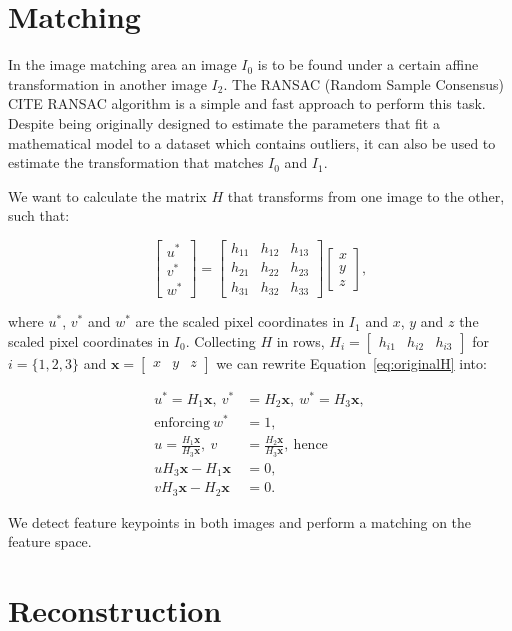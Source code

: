 \documentclass[12pt]{article}
\begin{document}
\FloatBarrier %
\section{Matching}

In the image matching area an image $I_0$ is to be found under a certain affine transformation in another image $I_2$.
The RANSAC (Random Sample Consensus) CITE RANSAC algorithm is a simple and fast approach to perform this task.
Despite being originally designed to estimate the parameters that fit a mathematical model to a dataset which contains outliers, it can also be used to estimate the transformation that matches $I_0$ and $I_1$.

We want to calculate the matrix $H$ that transforms from one image to the other, such that:

\begin{equation}
\begin{bmatrix}
u^* \\ 
v^* \\ 
w^*
\end{bmatrix}
= 
\begin{bmatrix}
 h_{11} & h_{12} & h_{13} \\ 
 h_{21} & h_{22} & h_{23}\\ 
 h_{31} & h_{32} & h_{33}
\end{bmatrix}
\begin{bmatrix}
x \\
y \\
z
\end{bmatrix},
\label{eq:originalH}
\end{equation}

where $u^*$, $v^*$ and $w^*$ are the scaled pixel coordinates in $I_1$ and $x$, $y$ and $z$ the scaled pixel coordinates in $I_0$.
Collecting $H$ in rows, $H_i = \begin{bmatrix} h_{i1} & h_{i2} & h_{i3} \end{bmatrix}$ for $i = \lbrace 1,2,3 \rbrace$ and $\mathbf{x} = \begin{bmatrix} x & y & z \end{bmatrix}$ we can rewrite Equation~\ref{eq:originalH} into:

\begin{equation}
\begin{aligned}
	u^* = H_1 \mathbf{x}, \: v^* &= H_2 \mathbf{x}, \: w^* = H_3 \mathbf{x}, \\ 
	\text{enforcing} \: w^* &= 1, \\
	u = \frac{H_1 \mathbf{x}}{ H_3 \mathbf{x}}, \: v &= \frac{H_2 \mathbf{x}}{ H_3 \mathbf{x}}, \: \text{hence} \\
	uH_3\mathbf{x} - H_1\mathbf{x} &= 0, \\
	vH_3\mathbf{x} - H_2\mathbf{x} &= 0.
\end{aligned}
\end{equation}

We detect feature keypoints in both images and perform a matching on the feature space.


\section{Reconstruction}
\end{document}
